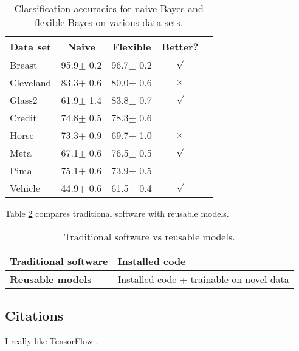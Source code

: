 \documentclass{article}
\begin{document}
\begin{table}[t]
  \caption{Classification accuracies for naive Bayes and flexible
    Bayes on various data sets.}
  \label{sample-table}
  \begin{center}
    \begin{small}
      \begin{sc}
        \begin{tabular}{lcccr}
          \toprule
          Data set & Naive & Flexible & Better? \\
          \midrule
          Breast    & 95.9$\pm$ 0.2& 96.7$\pm$ 0.2& $\surd$ \\
          Cleveland & 83.3$\pm$ 0.6& 80.0$\pm$ 0.6& $\times$\\
          Glass2    & 61.9$\pm$ 1.4& 83.8$\pm$ 0.7& $\surd$ \\
          Credit    & 74.8$\pm$ 0.5& 78.3$\pm$ 0.6&         \\
          Horse     & 73.3$\pm$ 0.9& 69.7$\pm$ 1.0& $\times$\\
          Meta      & 67.1$\pm$ 0.6& 76.5$\pm$ 0.5& $\surd$ \\
          Pima      & 75.1$\pm$ 0.6& 73.9$\pm$ 0.5&         \\
          Vehicle   & 44.9$\pm$ 0.6& 61.5$\pm$ 0.4& $\surd$ \\
          \bottomrule
        \end{tabular}
      \end{sc}
    \end{small}
  \end{center}
  \vskip -0.1in
\end{table}

Table \ref{software-vs-models} compares traditional software with
reusable models.

\begin{table}[h!]
  \begin{center}
    \caption{Traditional software vs reusable models.}
    \label{software-vs-models}
    \begin{small}
      \begin{tabular}{l|l}
        \toprule
        \textbf{Traditional software} & Installed code \\ \hline
        \textbf{Reusable models} & Installed code + trainable on novel data \\
        \bottomrule
      \end{tabular}
    \end{small}
  \end{center}
\end{table}

\subsection{Citations}

I really like TensorFlow \cite{tensorflow2015-whitepaper}.



\end{document}
